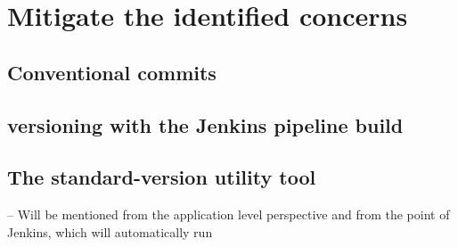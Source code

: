 
\chapter{Mitigate the identified concerns} %

\label{Chapter 4} %
\section{Conventional commits} 

\section{versioning with the Jenkins pipeline build} 

\section{The standard-version utility tool} -- Will be mentioned from the application level perspective and from the point of Jenkins, which will automatically run

\clearpage\null\thispagestyle{empty}